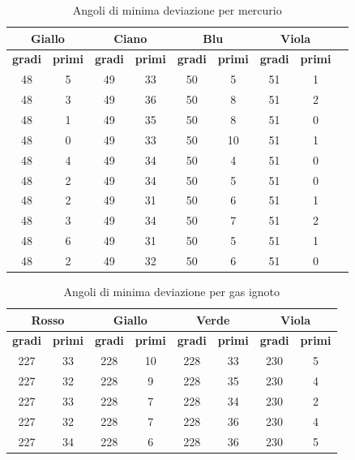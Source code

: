 \documentclass[letterpaper,12pt]{article}
\begin{document}
\begin{table}[h!]
    \centering
    \begin{tabular}{|c|c|c|c|c|c|c|c|c|}
    \hline
    \multicolumn{2}{|c|}{\textbf{Giallo}} & \multicolumn{2}{|c|}{\textbf{Ciano}} & \multicolumn{2}{|c|}{\textbf{Blu}} & \multicolumn{2}{|c|}{\textbf{Viola}} \\
    \hline
    \textbf{gradi} & \textbf{primi} & \textbf{gradi} & \textbf{primi} & \textbf{gradi} & \textbf{primi} & \textbf{gradi} & \textbf{primi} \\
    \hline
    48 & 5 & 49 & 33 & 50 & 5 & 51 & 1 \\
    48 & 3 & 49 & 36 & 50 & 8 & 51 & 2 \\
    48 & 1 & 49 & 35 & 50 & 8 & 51 & 0 \\
    48 & 0 & 49 & 33 & 50 & 10 & 51 & 1 \\
    48 & 4 & 49 & 34 & 50 & 4 & 51 & 0 \\
    48 & 2 & 49 & 34 & 50 & 5 & 51 & 0 \\
    48 & 2 & 49 & 31 & 50 & 6 & 51 & 1 \\
    48 & 3 & 49 & 34 & 50 & 7 & 51 & 2 \\
    48 & 6 & 49 & 31 & 50 & 5 & 51 & 1 \\
    48 & 2 & 49 & 32 & 50 & 6 & 51 & 0 \\
    \hline
    \end{tabular}
    \caption{Angoli di minima deviazione per mercurio}
    \label{tab:prisma_md}
    \end{table}

    \begin{table}[h!]
        \centering
        \begin{tabular}{|c|c|c|c|c|c|c|c|}
        \hline
        \multicolumn{2}{|c|}{\textbf{Rosso}} & \multicolumn{2}{|c|}{\textbf{Giallo}} & \multicolumn{2}{|c|}{\textbf{Verde}} & \multicolumn{2}{|c|}{\textbf{Viola}} \\
        \hline
        \textbf{gradi} & \textbf{primi} & \textbf{gradi} & \textbf{primi} & \textbf{gradi} & \textbf{primi} & \textbf{gradi} & \textbf{primi} \\
        \hline
        227 & 33 & 228 & 10 & 228 & 33 & 230 & 5 \\
        227 & 32 & 228 & 9 & 228 & 35 & 230 & 4 \\
        227 & 33 & 228 & 7 & 228 & 34 & 230 & 2 \\
        227 & 32 & 228 & 7 & 228 & 36 & 230 & 4 \\
        227 & 34 & 228 & 6 & 228 & 36 & 230 & 5 \\
        \hline
        \end{tabular}
        \caption{Angoli di minima deviazione per gas ignoto}
        \label{tab:prisma_md_ignoto}
        \end{table}
        
\end{document}
